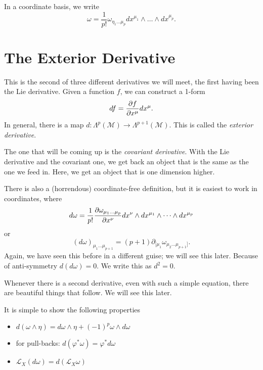 In a coordinate basis, we write
\begin{equation}
  \omega = \frac{1}{p!} \omega_{\eta_1 \dots \mu_p} dx^{\mu_1} \wedge \dots \wedge dx^{\mu_p}.
\end{equation}

\section{The Exterior Derivative}%
\label{sec:the_exterior_derivative}

This is the second of three different derivatives we will meet, the first having been the Lie derivative.
Given a function $f$, we can construct a 1-form
\begin{equation}
  df = \pdv{f}{x^\mu} dx^\mu.
\end{equation}
In general, there is a map $d: \Lambda^p(\mathcal{M}) \to \Lambda^{p+1}(\mathcal{M})$. This is called the \emph{exterior derivative}.
\begin{leftbar}
  \begin{remark}
    The one that will be coming up is the \emph{covariant derivative}. With the Lie derivative and the covariant one, we get back an object that is the same as the one we feed in. Here, we get an object that is one dimension higher.
  \end{remark}
\end{leftbar}
There is also a (horrendous) coordinate-free definition, but it is easiest to work in coordinates, where
\begin{equation}
  d\omega = \frac{1}{p!} \pdv{\omega_{\mu_1 \dots \mu_p}}{x^\nu} dx^\nu \wedge dx^{\mu_1} \wedge \dots \wedge dx^{\mu_p}
\end{equation}
or
\begin{equation}
  (d\omega)_{\mu_1 \dots \mu_{p+1}} = (p+1) \partial_{[\mu_1} \omega_{\mu_2 \dots \mu_{p+1}]}.
\end{equation}
Again, we have seen this before in a different guise; we will see this later.
Because of anti-symmetry $d(d\omega) = 0$. We write this as $d^2 = 0$.
\begin{leftbar}
  \begin{remark}
    Whenever there is a second derivative, even with such a simple equation, there are beautiful things that follow. We will see this later.
  \end{remark}
\end{leftbar}
It is simple to show the following properties
\begin{itemize}
  \item $d(\omega \wedge\eta) = d\omega \wedge \eta + (-1)^p \omega \wedge d \omega$
  \item for pull-backs: $d(\varphi^* \omega) = \varphi^* d\omega$
  \item $\mathcal{L}_X (d\omega) = d(\mathcal{L}_X \omega)$
\end{itemize}
